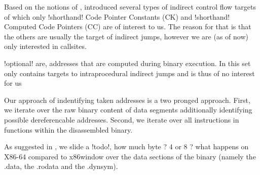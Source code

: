 Based on the notions of \cite{ZhangSekar00}, introduced several types of indirect control flow targets of which only {!shorthand! Code Pointer Constants (CK)} and {!shorthand! Computed Code Pointers (CC)} are of interest to us. The reason for that is that the others are usually the target of indirect jumps, however we are (as of now) only interested in callsites.


{!optional!
 { are, addresses that are computed during binary execution. In \cite{ZhangSekar00}  this set only contains targets to intraprocedural indirect jumps and is thus of no interest for us} }

Our approach of indentifying taken addresses is a two pronged approach. First, we iterate over the raw binary content of data segments additionally identifying possible dereferencable addresses. Second, we iterate over all instructions in functions within the disassembled binary.



As suggested in \cite{ZhangSekar00}, we slide a {!todo!, how much byte ? 4 or 8 ? what happens on X86-64 compared to x86}window over the data sections of the binary (namely the .data, the .rodata and the .dynsym).



